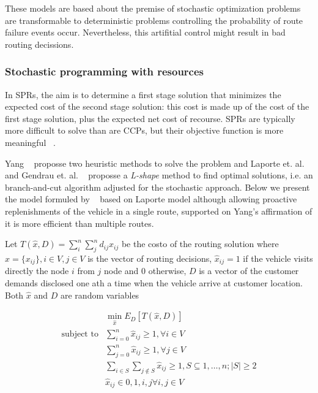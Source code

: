These models are based about the premise of stochastic optimization problems are transformable to deterministic problems controlling the probability of route failure events occur. Nevertheless, this artifitial control might result in bad routing decissions.


\subsubsection{Stochastic programming with resources}

In SPRs, the aim is to determine a first stage solution that minimizes the expected cost of the second stage solution: this cost is made up of the cost of the first stage solution, plus the expected net cost of recourse. SPRs are typically more difficult to solve than are CCPs, but their objective function is more meaningful ~\cite{gendreau_stochastic_1996}.


Yang ~\cite{yang_stochastic_2000} proposse two heuristic methods to solve the problem and Laporte et. al. ~\cite{laporte_integer_2002} and Gendrau et. al. ~\cite{gendreau_exact_1995} proposse a \textit{L-shape} method to find optimal solutions, i.e. an branch-and-cut algorithm adjusted for the stochastic approach. Below we present the model formuled by ~\cite{Dror_2005} based on Laporte model although allowing proactive replenishments of the vehicle in a single route, supported on Yang's affirmation of it is more efficient than multiple routes.

Let $T(\hat{x},D) =\sum_i^n\sum_j^nd_{ij}x_{ij}$ be the costo of the routing solution where $\hat{x}=\{x_{ij}\},i\in V,j\in V$ is the vector of routing decisions, $\hat{x}_{ij} =1$ if the vehicle visits directly the node $i$ from $j$ node and $0$ otherwise, $D$ is a vector of the customer demands disclosed one ath a time when the vehicle arrive at customer location. Both $\hat{x}$ and $D$ are random variables

\begin{align}\label{eq:SPR}
  & \min\limits_{\hat{x}} E_D[T(\hat{x},D)]\\ 
 \text{subject to} & \sum_{i=0}^n\hat{x}_{ij} \geq 1, \forall i \in V\\
  & \sum_{j=0}^n\hat{x}_{ij} \geq 1, \forall j \in V\\
  & \sum_{i\in S}\sum_{j\notin S}\hat{x}_{ij} \geq 1, S\subseteq {1,\ldots,n};|S|\geq2\\
  & \hat{x}_{ij} \in {0,1}, i,j \forall i,j \in V
\end{align}

